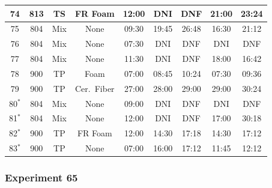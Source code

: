 \begin{table}[ht]
\begin{tabular}{|c|c|c|c|c|c|c|c|c|}
74     & 813     & TS       & FR Foam          & 12:00     & DNI        & DNF              & 21:00      & 23:24            \\ \hline
75     & 804     & Mix      & None             & 09:30     & 19:45      & 26:48            & 16:30      & 21:12            \\ \hline
76     & 804     & Mix      & None             & 07:30     & DNI        & DNF              & DNI        & DNF              \\ \hline
77     & 804     & Mix      & None             & 11:30     & DNI        & DNF              & 18:00      & 16:42            \\ \hline
78     & 900     & TP       & Foam             & 07:00     & 08:45      & 10:24            & 07:30      & 09:36            \\ \hline
79     & 900     & TP       & Cer.~Fiber       & 27:00     & 28:00      & 29:00            & 29:00      & 30:24            \\ \hline
80$^*$ & 804     & Mix      & None             & 09:00     & DNI        & DNF              & DNI        & DNF              \\ \hline
81$^*$ & 804     & Mix      & None             & 12:00     & DNI        & DNF              & 17:00      & 30:18            \\ \hline
82$^*$ & 900     & TP       & FR Foam          & 12:00     & 14:30      & 17:18            & 14:30      & 17:12            \\ \hline
83$^*$ & 900     & TP       & None             & 07:00     & 16:00      & 17:12            & 11:45      & 12:12            \\ \hline
\end{tabular}
\end{table}






\clearpage

\subsubsection{Experiment 65}

